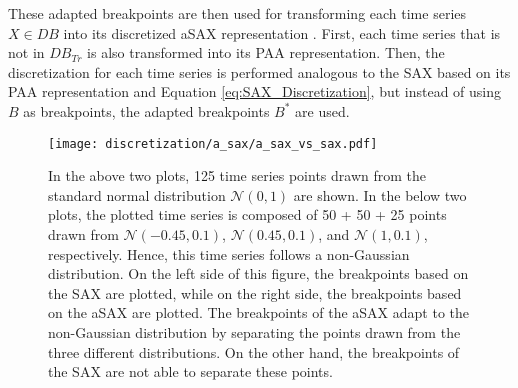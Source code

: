 These adapted breakpoints are then used for transforming each time series $X \in DB$ into its discretized \ac{aSAX} representation \cite{A_SAX}. First, each time series that is not in $DB_{Tr}$ is also transformed into its \ac{PAA} representation. Then, the discretization for each time series is performed analogous to the \ac{SAX} based on its \ac{PAA} representation and Equation \ref{eq:SAX_Discretization}, but instead of using $B$ as breakpoints, the adapted breakpoints $B^*$ are used.
\newpage
\begin{figure}[htb]
\centering
\texttt{[image: discretization/a\_sax/a\_sax\_vs\_sax.pdf]}
\caption[Adaptive Symbolic Aggregate Approximation - SAX vs. aSAX]{In the above two plots, 125 time series points drawn from the standard normal distribution $\mathcal{N}(0,1)$ are shown. In the below two plots, the plotted time series is composed of 50 + 50 + 25 points drawn from $\mathcal{N}(-0.45,0.1)$, $\mathcal{N}(0.45,0.1)$, and $\mathcal{N}(1,0.1)$, respectively. Hence, this time series follows a non-Gaussian distribution. On the left side of this figure, the breakpoints based on the \ac{SAX} are plotted, while on the right side, the breakpoints based on the \ac{aSAX} are plotted. The breakpoints of the \ac{aSAX} adapt to the non-Gaussian distribution by separating the points drawn from the three different distributions. On the other hand, the breakpoints of the \ac{SAX} are not able to separate these points.}
\label{fig:Diff_Breakpoints}
\end{figure}
